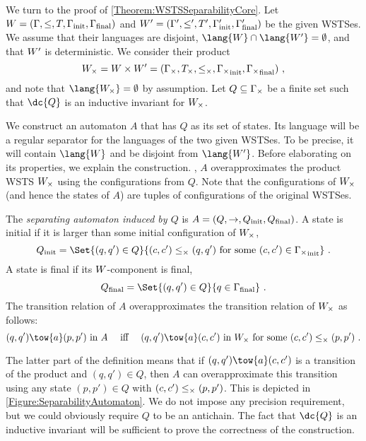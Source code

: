 \documentclass[../../diss.tex]{subfiles}
\begin{document}
We turn to the proof of \cref{Theorem:WSTSSeparabilityCore}.
Let $W = (\Gamma,\leq,T,\Gamma_{\text{init}},\Gamma_{\text{final}})$ and $W' = (\Gamma',\leq',T',\Gamma_{\text{init}}',\Gamma_{\text{final}}')$ be the given WSTSes.
We assume that their languages are disjoint, $\lang{\wsts} \cap \lang{\wstsprime} = \emptyset$, and that $W'$ is deterministic.
We consider their product
\[
    W_\times = W \times W' = ({\Gamma_\times},T_\times,\leq_\times,{\Gamma_\times}_{\text{init}},{\Gamma_\times}_{\text{final}})
    \ ,
\]
and note that $\lang{\prodwsts} = \emptyset$ by assumption.
Let $Q \subseteq {\Gamma_\times}$ be a finite set such that $\dc{Q}$ is an inductive invariant for $W_\times$.

We construct an automaton $A$ that has $Q$ as its set of states.
Its language will be a regular separator for the languages of the two given WSTSes.
To be precise, it will contain $\lang{\wsts}$ and be disjoint from $\lang{\wstsprime}$.
Before elaborating on its properties, we explain the construction.
, $A$ overapproximates the product WSTS $W_\times$ using the configurations from $Q$.
Note that the configurations of $W_\times$ (and hence the states of $A$) are tuples of configurations of the original WSTSes.


\begin{definition}%
\label{Definition:WSTSSeparabilityAutomaton}%
    The \emph{separating automaton induced by $Q$} is $A = (Q,\to,Q_{\text{init}},Q_{\text{final}})$.
    A state is initial if it is larger than some initial configuration of $W_\times$,
    \[
        Q_\init = \Set{ (q,q') \in Q }{ (c,c') \prodleq (q,q') \text{ for some } (c,c') \in \prodconfigs_\init}
        \ .
    \]
    A state is final if its $W$-component is final,
    \[
        Q_\final = \Set{ (q,q') \in Q}{ q \in \configs_\final}
        \ .
    \]
    The transition relation of $A$ overapproximates the transition relation of $W_\times$ as follows:
    \[
        (q,q') \tow{a} (p,p') \text{ in } A
        \quad \textiff \quad
        (q,q') \tow{a} (c,c') \text{ in } \prodwsts \text{ for some } (c,c') \prodleq (p,p')
        \ .
    \]
\end{definition}

The latter part of the definition means that if $(q,q') \tow{a} (c,c')$ is a transition of the product and $(q,q') \in Q$, then $A$ can overapproximate this transition using any state $(p,p') \in Q$ with $(c,c') \leq_\times (p,p')$.
This is depicted in \cref{Figure:SeparabilityAutomaton}.
We do not impose any precision requirement, but we could obviously require $Q$ to be an antichain.
The fact that $\dc{Q}$ is an inductive invariant will be sufficient to prove the correctness of the construction.
\end{document}
